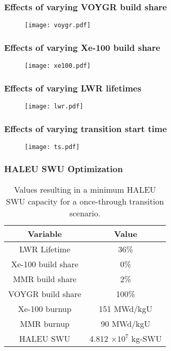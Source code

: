 \begin{frame}
    \frametitle{Effects of varying VOYGR build share}
    \begin{figure}
        \centering
        \texttt{[image: voygr.pdf]}
    \end{figure}
\end{frame}

\begin{frame}
    \frametitle{Effects of varying Xe-100 build share}
    \begin{figure}
        \centering
        \texttt{[image: xe100.pdf]}
    \end{figure}
\end{frame}
\begin{frame}
    \frametitle{Effects of varying LWR lifetimes}
    \begin{figure}
        \centering
        \texttt{[image: lwr.pdf]}
    \end{figure}
\end{frame}
\begin{frame}
    \frametitle{Effects of varying transition start time}
    \begin{figure}
        \centering
        \texttt{[image: ts.pdf]}
    \end{figure}
\end{frame}

\begin{frame}
    \frametitle{HALEU SWU Optimization}
    
\begin{table}[h!]
    \centering 
    \caption{Values resulting in a minimum \gls{HALEU} \gls{SWU} capacity for 
              a once-through transition scenario.}
    \label{tab:soga_ot_haleu}
    \begin{tabular}{c c}
        \hline
        Variable & Value \\
        \hline
        LWR Lifetime & 36\%\\
        Xe-100 build share & 0\%\\
        MMR build share & 2\%\\
        VOYGR build share & 100\%\\
        Xe-100 burnup & 151 MWd/kgU\\
        MMR burnup & 90 MWd/kgU\\
        \hline
        HALEU SWU & 4.812 $\times 10^7$ kg-SWU\\
        \hline
    \end{tabular}
\end{table}
    
\end{frame}

